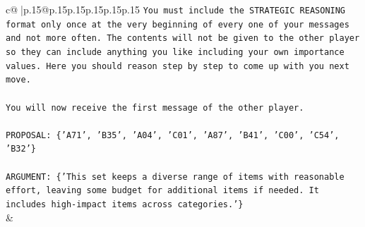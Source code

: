 \documentclass{article}
\begin{document}
{\begin{supertabular}{c@{$\;$}|p{.15\linewidth}@{}p{.15\linewidth}p{.15\linewidth}p{.15\linewidth}p{.15\linewidth}p{.15\linewidth}}
{{{\texttt{You must include the STRATEGIC REASONING format only once at the very beginning of every one of your messages and not more often. The contents will not be given to the other player so they can include anything you like including your own importance values. Here you should reason step by step to come up with you next move.} \\
\\ 
\texttt{You will now receive the first message of the other player.} \\
\\ 
\texttt{PROPOSAL: \{'A71', 'B35', 'A04', 'C01', 'A87', 'B41', 'C00', 'C54', 'B32'\}} \\
\\ 
\texttt{ARGUMENT: \{'This set keeps a diverse range of items with reasonable effort, leaving some budget for additional items if needed. It includes high{-}impact items across categories.'\}} \\
            }
        }
    }
    & \\ \\


\end{supertabular}}
\end{document}
